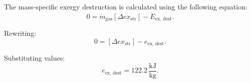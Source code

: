 The mass-specific exergy destruction is calculated using the following equation:  
\[
0 = \dot{m}_{\text{gas}} \left[ \Delta ex_{\text{str}} \right] - \dot{E}_{\text{ex, dest}}.
\]  

Rewriting:  
\[
0 = \left[ \Delta ex_{\text{str}} \right] - e_{\text{ex, dest}}.
\]  

Substituting values:  
\[
e_{\text{ex, dest}} = 122.2 \, \frac{\text{kJ}}{\text{kg}}.
\]